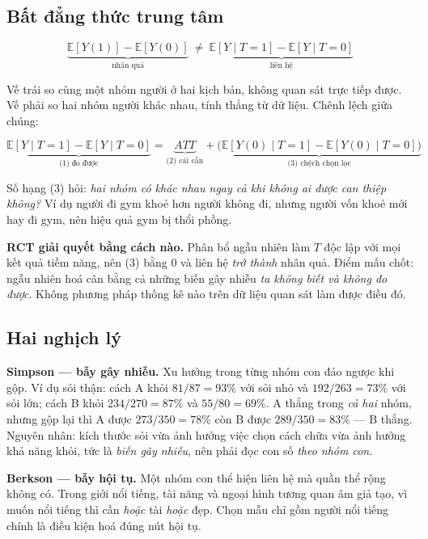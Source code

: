 \documentclass[11pt]{article}
\begin{document}
\subsection*{Bất đẳng thức trung tâm}

\[
\underbrace{\mathbb{E}[Y(1)] - \mathbb{E}[Y(0)]}_{\text{nhân quả}}
\ \neq\
\underbrace{\mathbb{E}[Y\mid T{=}1] - \mathbb{E}[Y\mid T{=}0]}_{\text{liên hệ}}
\]

Vế trái so cùng một nhóm người ở hai kịch bản, không quan sát trực tiếp được. Vế
phải so hai nhóm người khác nhau, tính thẳng từ dữ liệu. Chênh lệch giữa chúng:

\[
\underbrace{\mathbb{E}[Y\mid T{=}1] - \mathbb{E}[Y\mid T{=}0]}_{\text{(1) đo được}}
= \underbrace{ATT}_{\text{(2) cái cần}}
+ \underbrace{\bigl(\mathbb{E}[Y(0)\mid T{=}1] - \mathbb{E}[Y(0)\mid T{=}0]\bigr)}_{\text{(3) chệch chọn lọc}}
\]

Số hạng (3) hỏi: \emph{hai nhóm có khác nhau ngay cả khi không ai được can thiệp
không?} Ví dụ người đi gym khoẻ hơn người không đi, nhưng người vốn khoẻ mới hay
đi gym, nên hiệu quả gym bị thổi phồng.

\textbf{RCT giải quyết bằng cách nào.} Phân bổ ngẫu nhiên làm $T$ độc lập với mọi
kết quả tiềm năng, nên (3) bằng 0 và liên hệ \emph{trở thành} nhân quả. Điểm mấu
chốt: ngẫu nhiên hoá cân bằng cả những biến gây nhiễu \emph{ta không biết và không
đo được}. Không phương pháp thống kê nào trên dữ liệu quan sát làm được điều đó.

\subsection*{Hai nghịch lý}

\textbf{Simpson --- bẫy gây nhiễu.} Xu hướng trong từng nhóm con đảo ngược khi gộp.
Ví dụ sỏi thận: cách A khỏi $81/87 = 93\%$ với sỏi nhỏ và $192/263 = 73\%$ với sỏi
lớn; cách B khỏi $234/270 = 87\%$ và $55/80 = 69\%$. A thắng trong \emph{cả hai}
nhóm, nhưng gộp lại thì A được $273/350 = 78\%$ còn B được $289/350 = 83\%$ --- B
thắng. Nguyên nhân: kích thước sỏi vừa ảnh hưởng việc chọn cách chữa vừa ảnh hưởng
khả năng khỏi, tức là \emph{biến gây nhiễu}, nên phải đọc con số \emph{theo nhóm con}.

\textbf{Berkson --- bẫy hội tụ.} Một nhóm con thể hiện liên hệ mà quần thể rộng
không có. Trong giới nổi tiếng, tài năng và ngoại hình tương quan âm giả tạo, vì
muốn nổi tiếng thì cần \emph{hoặc} tài \emph{hoặc} đẹp. Chọn mẫu chỉ gồm người nổi
tiếng chính là điều kiện hoá đúng nút hội tụ.
\end{document}
